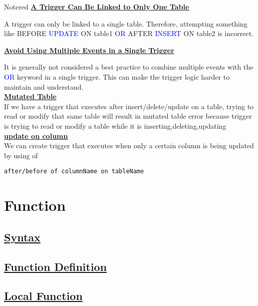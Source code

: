 \begin{prettyBox}{Note}{red}
\textbf{\underline{A Trigger Can Be Linked to Only One Table}}

\vspace{0.15cm}
A trigger can only be linked to a single table. Therefore, attempting something like 
BEFORE \textcolor{blue}{UPDATE} ON table1 \textcolor{blue}{OR} AFTER \textcolor{blue}{INSERT} ON table2 is incorrect.

\vspace{0.25cm}

\textbf{\underline{Avoid Using Multiple Events in a Single Trigger}}

\vspace{0.15cm}
It is generally not considered a best practice to combine multiple events with the \textcolor{blue}{OR} keyword in a single trigger. This can make the trigger logic harder to maintain and understand.\\[0.15cm]
\textbf{\underline{Mutated Table}}\\[0.15cm]
If we have a trigger that executes after insert/delete/update on a table, trying to read or modify that same table will result in mutated table error because trigger is trying to read or modify a table while it is inserting,deleting,updating\\[0.25cm]
\textbf{\underline{update on column}}\\[0.15cm]
We can create trigger that executes when only a certain column is being updated by using of
\begin{lstlisting}
after/before of columnName on tableName
\end{lstlisting}
\end{prettyBox}

\newpage
\section{Function}


\subsection*{\underline{Syntax}}

\subsection*{\underline{Function Definition}}

\subsection*{\underline{Local Function}}


